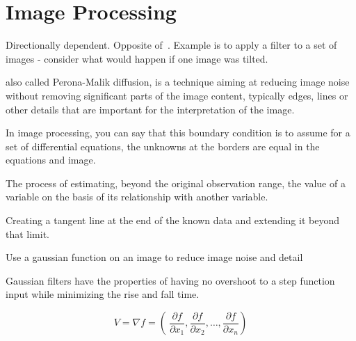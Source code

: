 \section{Image Processing}

\begin{definition}[Anisotropy]\label{anisotropy}
    Directionally dependent. Opposite of~.
    Example is to apply a filter to a set of images - consider
    what would happen if one image was tilted.
\end{definition}

\begin{definition}
    also called Perona-Malik diffusion, is a technique aiming at reducing image
    noise without removing significant parts of the image content, typically
    edges, lines or other details that are important for the interpretation of
    the image.

\end{definition}

\begin{definition}
    In image processing, you can say that this boundary condition is to assume
    for a set of differential equations, the unknowns at the borders are 
    equal in the equations and image.

\end{definition}

\begin{definition}[extrapolation]
    The process of estimating, beyond the original observation range, the value
    of a variable on the basis of its relationship with another variable.

    Creating a tangent line at the end of the known data and extending it
    beyond that limit.

\end{definition}

\begin{definition}
    Use a gaussian function on an image to reduce image noise and detail
\end{definition}

\begin{definition}
    Gaussian filters have the properties of having no overshoot to a step
    function input while minimizing the rise and fall time.

\end{definition}


\begin{definition}
    $$
        V = \nabla{f} = \left(\
        \frac{\partial{f}}{\partial{x_{1}}},
        \frac{\partial{f}}{\partial{x_{2}}},
        \dots,
        \frac{\partial{f}}{\partial{x_{n}}}
    \right)
    $$
\end{definition}

